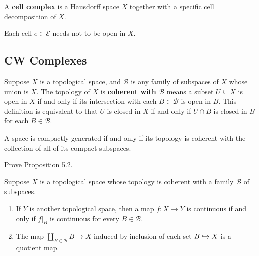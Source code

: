 A \textbf{cell complex} is a Hausdorff space \( X \) together with a specific cell decomposition of \( X \).

Each cell \( e \in \mathscr{E} \) needs not to be open in \( X \).

\subsection*{CW Complexes}

Suppose \( X \) is a topological space, and \( \mathscr{B} \) is any family of subspaces of \( X \) whose union is \( X \). The topology of \( X \) is \textbf{coherent with \( \mathscr{B} \)} means a subset \( U \subseteq X \) is open in \( X \) if and only if its intersection with each \( B\in\mathscr{B} \) is open in \( B \). This definition is equivalent to that \( U \) is closed in \( X \) if and only if \( U\cap B \) is closed in \( B \) for each \( B \in \mathscr{B} \).

A space is compactly generated if and only if its topology is coherent with the collection of all of its compact subspaces.

\begin{exercise}{5.3}\label{exercise:5.3}
	Prove Proposition 5.2.

	Suppose \( X \) is a topological space whose topology is coherent with a family \( \mathscr{B} \) of subspaces.
	\begin{enumerate}[label={(\alph*)}]
		\item If \( Y \) is another topological space, then a map \( f: X\to Y \) is continuous if and only if \( f\vert_{B} \) is continuous for every \( B\in \mathscr{B} \).
		\item The map \( \coprod_{B\in\mathscr{B}}B \to X \) induced by inclusion of each set \( B\xhookrightarrow{} X \) is a quotient map.
	\end{enumerate}
\end{exercise}

